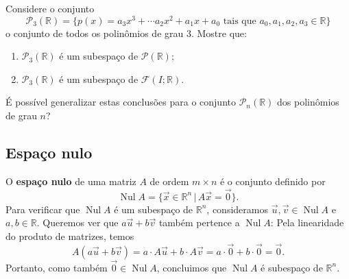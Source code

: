 \documentclass[../livro.tex]{subfiles}  %
\begin{document}
\begin{exercise}
	Considere o conjunto
	\begin{equation}
	\mathcal{P}_3 (\mathbb{R}) = \{ p(x) = a_3 x^3 + \cdots a_2 x^2 + a_1 x + a_0 \text{ tais que } a_0, a_1, a_2, a_3 \in \mathbb{R} \}
	\end{equation} o conjunto de todos os polinômios de grau 3. Mostre que:
	\begin{enumerate}
		\item $\mathcal{P}_3 (\mathbb{R})$ é um subespaço de $\mathcal{P} (\mathbb{R})$;
		\item $\mathcal{P}_3 (\mathbb{R})$ é um subespaço de $\mathcal{F} (I;\mathbb{R})$.
	\end{enumerate} É possível generalizar estas conclusões para o conjunto $\mathcal{P}_n (\mathbb{R})$ dos polinômios de grau $n$?
\end{exercise}


\subsection{Espaço nulo}

O \textbf{espaço nulo} de uma matriz $A$ de ordem $m \times n$ é o conjunto definido por
\begin{equation}
\operatorname{Nul} A = \big\{ \vec{x} \in \mathbb{R}^n \, | \, A\vec{x} = \vec{0}  \big\}.
\end{equation} Para verificar que $\operatorname{Nul} A$ é um subespaço de $\mathbb{R}^n$, consideramos $\vec{u}, \vec{v} \in \operatorname{Nul} A$ e $a,b \in \mathbb{R}$. Queremos ver que $a\vec{u} + b\vec{v}$ também pertence a $\operatorname{Nul} A$: Pela linearidade do produto de matrizes, temos
\begin{equation}
A (a\vec{u} + b\vec{v}) = a \cdot A\vec{u} + b\cdot A\vec{v} = a\cdot \vec{0} + b \cdot \vec{0} = \vec{0}.
\end{equation} Portanto, como também $\vec{0} \in \operatorname{Nul} A$, concluimos que $\operatorname{Nul} A$ é subespaço de $\mathbb{R}^n$.
\end{document}
